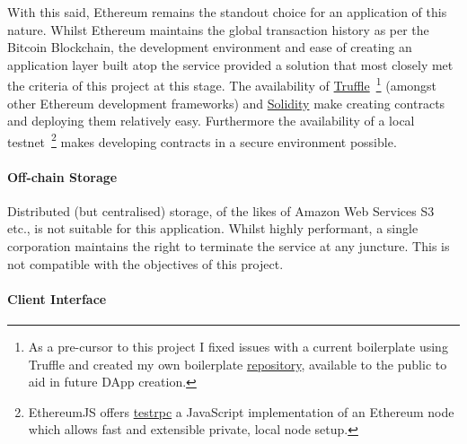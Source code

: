 With this said, Ethereum remains the standout choice for an application of this nature. Whilst Ethereum maintains the global transaction history as per the Bitcoin Blockchain, the development environment and ease of creating an application layer built atop the service provided a solution that most closely met the criteria of this project at this stage. The availability of \href{https://github.com/trufflesuite/truffle}{Truffle}~\footnote{As a pre-cursor to this project I fixed issues with a current boilerplate using Truffle and created my own boilerplate \href{https://github.com/FreddieLindsey/truffle-webpack-boilerplate}{repository}, available to the public to aid in future DApp creation.} (amongst other Ethereum development frameworks) and \href{https://github.com/ethereum/solidity}{Solidity} make creating contracts and deploying them relatively easy. Furthermore the availability of a local testnet~\footnote{EthereumJS offers \href{https://github.com/ethereumjs/testrpc}{testrpc} a JavaScript implementation of an Ethereum node which allows fast and extensible private, local node setup.} makes developing contracts in a secure environment possible.

\paragraph{Off-chain Storage}

Distributed (but centralised) storage, of the likes of Amazon Web Services S3 etc., is not suitable for this application. Whilst highly performant, a single corporation maintains the right to terminate the service at any juncture. This is not compatible with the objectives of this project.



\paragraph{Client Interface}



